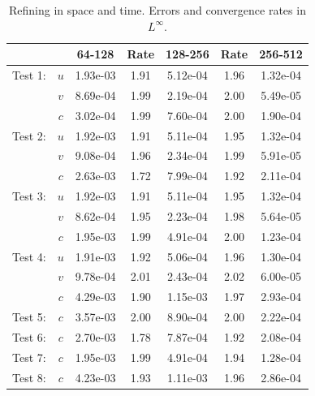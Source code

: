 \documentclass[final]{siamltex}
\begin{document}
\begin{table}[h]
\begin{center}
\caption{Refining in space and time.  Errors and convergence rates in $L^\infty$.}
\label{tab:Linf}
\begin{tabular}{ccccccc}
& & 64-128 & Rate & 128-256 & Rate & 256-512 \\
\hline
Test 1:             & $u$ & 1.93e-03 & 1.91 & 5.12e-04 & 1.96 & 1.32e-04 \\
                    & $v$ & 8.69e-04 & 1.99 & 2.19e-04 & 2.00 & 5.49e-05 \\
                    & $c$ & 3.02e-04 & 1.99 & 7.60e-04 & 2.00 & 1.90e-04 \\
\hline
Test 2:             & $u$ & 1.92e-03 & 1.91 & 5.11e-04 & 1.95 & 1.32e-04 \\
                    & $v$ & 9.08e-04 & 1.96 & 2.34e-04 & 1.99 & 5.91e-05 \\
                    & $c$ & 2.63e-03 & 1.72 & 7.99e-04 & 1.92 & 2.11e-04 \\
\hline
Test 3:             & $u$ & 1.92e-03 & 1.91 & 5.11e-04 & 1.95 & 1.32e-04 \\
                    & $v$ & 8.62e-04 & 1.95 & 2.23e-04 & 1.98 & 5.64e-05 \\
                    & $c$ & 1.95e-03 & 1.99 & 4.91e-04 & 2.00 & 1.23e-04 \\
\hline
Test 4:             & $u$ & 1.91e-03 & 1.92 & 5.06e-04 & 1.96 & 1.30e-04 \\
                    & $v$ & 9.78e-04 & 2.01 & 2.43e-04 & 2.02 & 6.00e-05 \\
                    & $c$ & 4.29e-03 & 1.90 & 1.15e-03 & 1.97 & 2.93e-04 \\
\hline
Test 5:             & $c$ & 3.57e-03 & 2.00 & 8.90e-04 & 2.00 & 2.22e-04 \\
\hline
Test 6:             & $c$ & 2.70e-03 & 1.78 & 7.87e-04 & 1.92 & 2.08e-04 \\
\hline
Test 7:             & $c$ & 1.95e-03 & 1.99 & 4.91e-04 & 1.94 & 1.28e-04 \\
\hline
Test 8:             & $c$ & 4.23e-03 & 1.93 & 1.11e-03 & 1.96 & 2.86e-04
\end{tabular}
\end{center}
\end{table}
\end{document}
